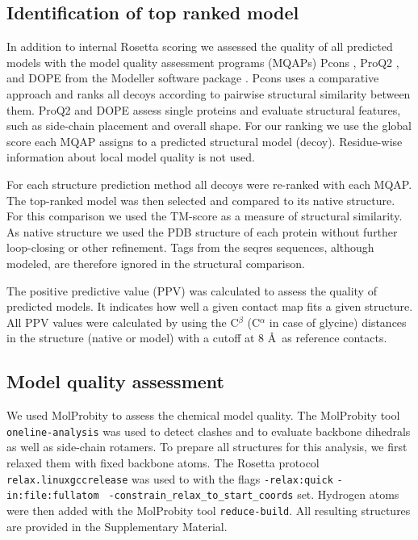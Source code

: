 \documentclass{bioinfo}
\begin{document}
\begin{methods}
\subsection{Identification of top ranked model}

In addition to internal Rosetta scoring we assessed the quality of all
predicted models with the model quality assessment programs (MQAPs)
Pcons \cite[]{lundstrom_pcons:_2001}, ProQ2
\cite[]{ray_improved_2012}, and DOPE from the Modeller software
package \cite[]{eswar_comparative_2006}. Pcons uses a comparative
approach and ranks all decoys according to pairwise structural
similarity between them. ProQ2 and DOPE assess single proteins and
evaluate structural features, such as side-chain placement and overall
shape. For our ranking we use the global score each MQAP assigns to a
predicted structural model (decoy). Residue-wise information about
local model quality is not used. 

For each structure prediction method all decoys were re-ranked with
each MQAP. The top-ranked model was then selected and compared to its
native structure. For this comparison we used the TM-score
\cite[]{zhang_scoring_2004} as a measure of structural similarity. As
native structure we used the PDB structure of each protein without
further loop-closing or other refinement. Tags from the seqres
sequences, although modeled, are therefore ignored in the structural
comparison.

The positive predictive value (PPV) was calculated to assess the quality of predicted models. It indicates how well a given contact map fits a given structure. All PPV values were calculated by using the C$^{\beta}$ (C$^{\alpha}$ in case of glycine) distances in the structure (native or model) with a cutoff at 8 \AA\ as reference contacts.


\subsection{Model quality assessment}

We used MolProbity \cite[]{chen_molprobity:_2010} to assess the chemical
model quality. The MolProbity tool {\tt oneline-analysis} was used to 
detect clashes and to evaluate backbone dihedrals as well as 
side-chain rotamers. To prepare all structures for this analysis, we 
first relaxed them with fixed backbone atoms.
The Rosetta protocol {\tt relax.linuxgccrelease} was used to with the flags 
{\tt -relax:quick} {\tt -in:file:fullatom} {\tt 
-constrain\_relax\_to\_start\_coords} set. Hydrogen atoms were then 
added with the MolProbity tool {\tt reduce-build}. All resulting 
structures are provided in the Supplementary Material.




\end{methods}
\end{document}
